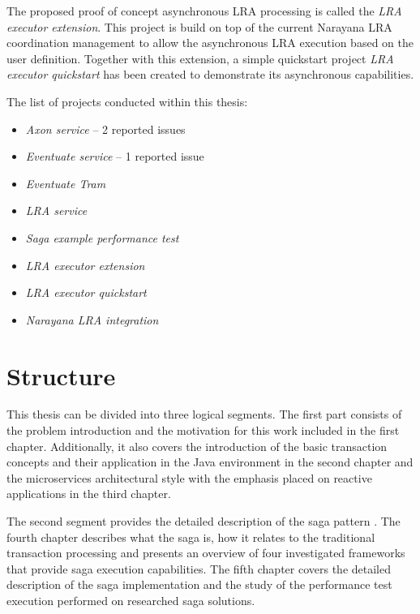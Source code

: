 \documentclass[oneside,
  digital, %
  table,   %
  nolof,     %
  nolot,     %
]{fithesis3}
\begin{document}
The proposed proof of concept asynchronous LRA processing is called the \textit{LRA executor extension}. This project is build on top of the current Narayana LRA coordination management to allow the asynchronous LRA execution based on the user definition. Together with this extension, a simple quickstart project \textit{LRA executor quickstart} has been created to demonstrate its asynchronous capabilities.

The list of projects conducted within this thesis:

\begin{itemize}
    \item \textit{Axon service} -- 2 reported issues
    
    \item \textit{Eventuate service} -- 1 reported issue
    
    \item \textit{Eventuate Tram}
    
    \item \textit{LRA service}
    
    \item \textit{Saga example performance test}
    
    \item \textit{LRA executor extension}
    
    \item \textit{LRA executor quickstart}
    
    \item \textit{Narayana LRA integration}
\end{itemize}

\section{Structure}

This thesis can be divided into three logical segments. The first part consists of the problem introduction and the motivation for this work included in the first chapter. Additionally, it also covers the introduction of the basic transaction concepts and their application in the Java environment in the second chapter and the microservices architectural style with the emphasis placed on reactive applications in the third chapter.

The second segment provides the detailed description of the saga pattern \cite{sagas_publ}. The fourth chapter describes what the saga is, how it relates to the traditional transaction processing and presents an overview of four investigated frameworks that provide saga execution capabilities. The fifth chapter covers the detailed description of the saga implementation and the study of the performance test execution performed on researched saga solutions.
\end{document}
